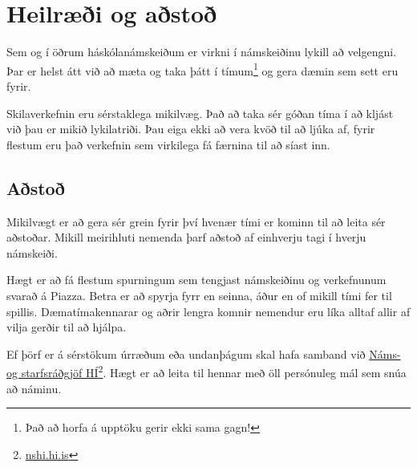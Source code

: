 \documentclass[justified, nobib]{tufte-handout}
\begin{document}
\section{Heilræði og aðstoð}
Sem og í öðrum háskólanámskeiðum er virkni í námskeiðinu lykill að velgengni. Þar er helst átt við að mæta og taka þátt í tímum\footnote{Það að horfa á upptöku gerir ekki sama gagn!} og gera dæmin sem sett eru fyrir.

Skilaverkefnin eru sérstaklega mikilvæg. Það að taka sér góðan tíma í að kljást við þau er mikið lykilatriði. Þau eiga ekki að vera kvöð til að ljúka af, fyrir flestum eru það verkefnin sem virkilega fá færnina til að síast inn.
\subsection{Aðstoð}
Mikilvægt er að gera sér grein fyrir því hvenær tími er kominn til að leita sér aðstoðar. Mikill meirihluti nemenda þarf aðstoð af einhverju tagi í hverju námskeiði.

Hægt er að fá flestum spurningum sem tengjast námskeiðinu og verkefnunum svarað á Piazza. Betra er að spyrja fyrr en seinna, áður en of mikill tími fer til spillis. Dæmatímakennarar og aðrir lengra komnir nemendur eru líka alltaf allir af vilja gerðir til að hjálpa.

Ef þörf er á sérstökum úrræðum eða undanþágum skal hafa samband við \href{http://nshi.hi.is/}{Náms- og starfsráðgjöf HÍ}\footnote{\url{nshi.hi.is}}. Hægt er að leita til hennar með öll persónuleg mál sem snúa að náminu.
\end{document}
